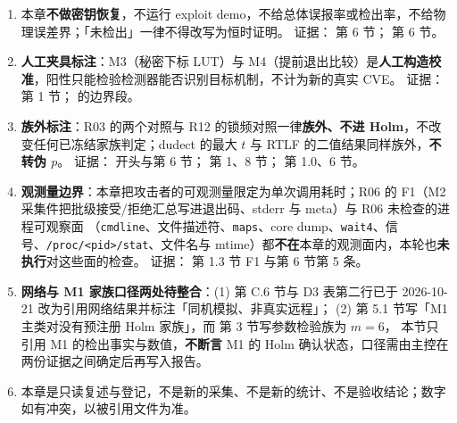 \begin{enumerate}
  \item 本章\textbf{不做密钥恢复}，不运行 exploit demo，不给总体误报率或检出率，不给物理误差界；「未检出」一律不得改写为恒时证明。
  证据：\texttt{} 第 6 节；\texttt{} 第 6 节。
  \item \textbf{人工夹具标注}：M3（秘密下标 LUT）与 M4（提前退出比较）是\textbf{人工构造校准}，阳性只能检验检测器能否识别目标机制，不计为新的真实 CVE。
  证据： 第 1 节； 的边界段。
  \item \textbf{族外标注}：R03 的两个对照与 R12 的锁频对照一律\textbf{族外、不进 Holm}，不改变任何已冻结家族判定；dudect 的最大 $t$ 与 RTLF 的二值结果同样族外，\textbf{不转伪 $p$}。
  证据： 开头与第 6 节； 第 1、8 节；\texttt{} 第 1.0、6 节。
  \item \textbf{观测量边界}：本章把攻击者的可观测量限定为单次调用耗时；R06 的 F1（M2 采集件把批级接受/拒绝汇总写进退出码、stderr 与 meta）与 R06 未检查的进程可观察面
  （\texttt{cmdline}、文件描述符、\texttt{maps}、core dump、\texttt{wait4}、信号、\texttt{/proc/<pid>/stat}、文件名与 mtime）都\textbf{不在}本章的观测面内，本轮也\textbf{未执行}对这些面的检查。
  证据： 第 1.3 节 F1 与第 6 节第 5 条。
  \item \textbf{网络与 M1 家族口径两处待整合}：(1) 第 C.6 节与 D3 表第二行已于 2026-10-21 改为引用网络结果并标注「同机模拟、非真实远程」；
  (2) \texttt{} 第 5.1 节写「M1 主类对没有预注册 Holm 家族」，而 \texttt{} 第 3 节写参数检验族为 $m=6$，
  本节只引用 M1 的检出事实与数值，\textbf{不断言} M1 的 Holm 确认状态，口径需由主控在两份证据之间确定后再写入报告。
  \item 本章是只读复述与登记，不是新的采集、不是新的统计、不是验收结论；数字如有冲突，以被引用文件为准。
\end{enumerate}
